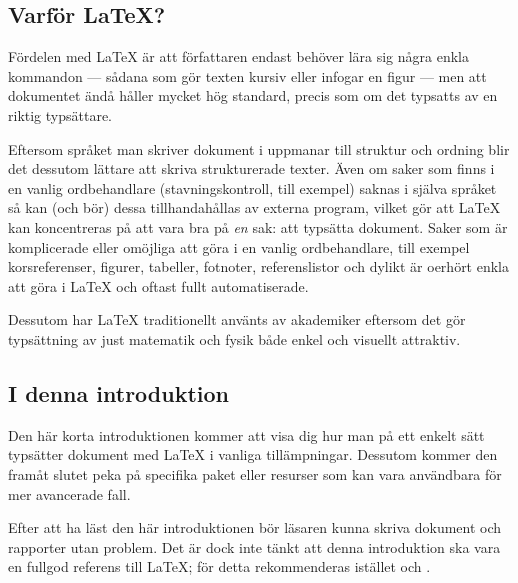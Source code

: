 \documentclass[swe,10pt,nofont]{skrapport}
\makeatletter
\let\@oldLaTeX\LaTeX
\def\LaTeX{\texorpdfstring{\@oldLaTeX}{LaTeX}}
\makeatother
\begin{document}
	\subsection*{Varför \LaTeX?}
	\addcontentsline{toc}{subsection}{Varför \LaTeX{}?}
	Fördelen med \LaTeX{} är att författaren endast behöver lära sig några
	enkla kommandon — sådana som gör texten kursiv eller infogar en figur
	— men att dokumentet ändå håller mycket hög standard, precis som om
	det typsatts av en riktig typsättare.
	
	Eftersom språket man skriver dokument i uppmanar till struktur och ordning
	blir det dessutom lättare att skriva strukturerade texter. Även om saker
	som finns i en vanlig ordbehandlare (stavningskontroll, till exempel) saknas i
	själva språket så kan (och bör) dessa tillhandahållas av externa program,
	vilket gör att \LaTeX{} kan koncentreras på att vara bra på \emph{en} sak:
	att typsätta dokument. Saker som är komplicerade eller omöjliga att göra
	i en vanlig ordbehandlare, till exempel korsreferenser, figurer, tabeller,
	fotnoter, referenslistor och dylikt är oerhört enkla att göra i \LaTeX{}
	och oftast fullt automatiserade.
	
	Dessutom har \LaTeX{} traditionellt använts av akademiker eftersom det gör 
	typsättning av just matematik och fysik både enkel och visuellt attraktiv. 
	
	\subsection*{I denna introduktion}
	Den här korta introduktionen kommer att visa dig hur man på ett enkelt
	sätt typsätter dokument med \LaTeX{} i vanliga tillämpningar.
	Dessutom kommer den framåt slutet peka på specifika paket eller
	resurser som kan vara användbara för mer avancerade fall.
	
	Efter att ha läst den här introduktionen bör läsaren kunna skriva
	dokument och rapporter utan problem. Det är dock inte tänkt att denna
	introduktion ska vara en fullgod referens till \LaTeX; för detta
	rekommenderas istället  och
	.
	
\end{document}
